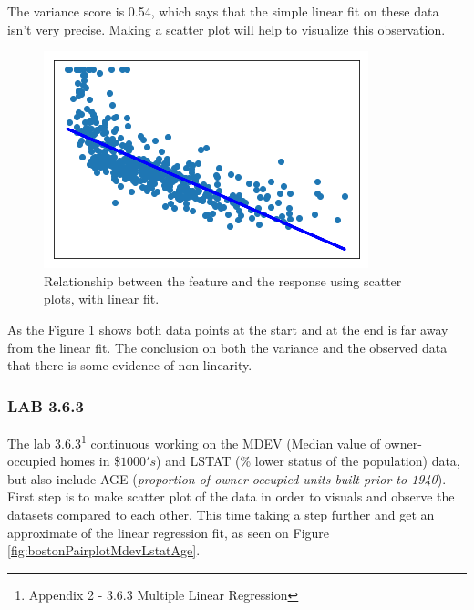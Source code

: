 The variance score is 0.54, which says that the simple linear fit on these data isn't very precise. Making a scatter plot will help to visualize this observation.

\begin{figure}[h]
	\centering
	\includegraphics[scale=0.6]{regression/multipleLinearRegression/fig/bostonScatterplotMdevLstatLinreg.png}
	\caption{Relationship between the feature and the response using scatter plots, with linear fit.}
	\label{fig:bostonScatterplotMdevLstatLinreg}
\end{figure}

As the Figure \ref{fig:bostonScatterplotMdevLstatLinreg} shows both data points at the start and at the end is far away from the linear fit. The conclusion on both the variance and the observed data that there is some evidence of non-linearity.

\subsubsection*{LAB 3.6.3}
The lab 3.6.3\footnote{Appendix 2 - 3.6.3 Multiple Linear Regression} continuous working on the MDEV (Median value of owner-occupied homes in $\$1000's$) and LSTAT (\% lower status of the population) data, but also include AGE (\textit{proportion of owner-occupied units built prior to 1940}). First step is to make scatter plot of the data in order to visuals and observe the datasets compared to each other. This time taking a step further and get an approximate of the linear regression fit, as seen on Figure \ref{fig:bostonPairplotMdevLstatAge}.

